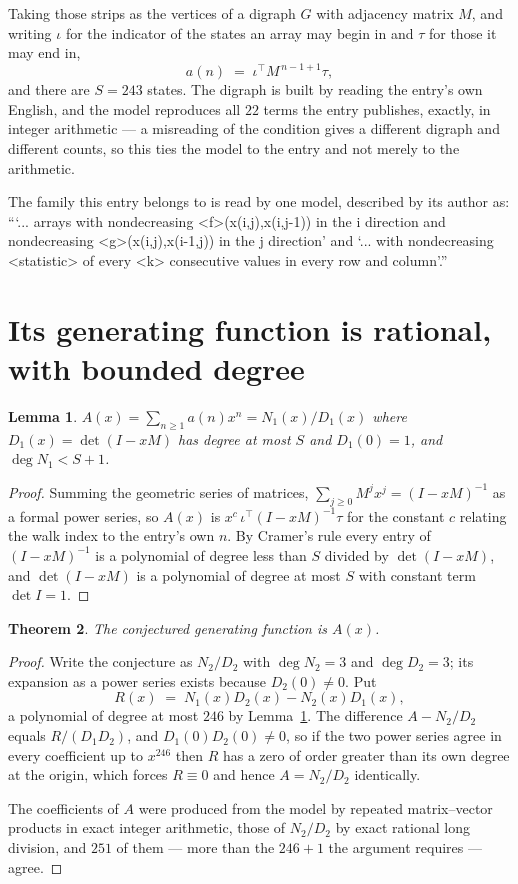 \documentclass[11pt,a4paper]{article}
\theoremstyle{plain}
\newtheorem{theorem}{Theorem}
\newtheorem{lemma}[theorem]{Lemma}
\theoremstyle{definition}
\begin{document}
Taking those strips as the vertices of a digraph $G$ with adjacency matrix $M$, and writing
$\iota$ for the indicator of the states an array may begin in and $\tau$ for those it may end
in,
\[
a(n)\;=\;\iota^{\!\top}M^{\,n-1+1}\tau ,
\]
and there are $S=243$ states. The digraph is built by reading the entry's own English, and the
model reproduces all $22$ terms the entry publishes, exactly, in integer arithmetic --- a
misreading of the condition gives a different digraph and different counts, so this ties the
model to the entry and not merely to the arithmetic.

The family this entry belongs to is read by one model, described by its author as: ```... arrays with nondecreasing <f>(x(i,j),x(i,j-1)) in the i direction and nondecreasing <g>(x(i,j),x(i-1,j)) in the j direction' and `... with nondecreasing <statistic> of every <k> consecutive values in every row and column'.''


\section{Its generating function is rational, with bounded degree}

\begin{lemma}\label{lem:rat}
$A(x)=\sum_{n\ge1}a(n)x^n=N_1(x)/D_1(x)$ where $D_1(x)=\det(I-xM)$ has degree at most
$S$ and $D_1(0)=1$, and $\deg N_1<S+1$.
\end{lemma}

\begin{proof}
Summing the geometric series of matrices, $\sum_{j\ge0}M^jx^j=(I-xM)^{-1}$ as a formal
power series, so $A(x)$ is $x^{c}\,\iota^{\!\top}(I-xM)^{-1}\tau$ for the constant $c$
relating the walk index to the entry's own $n$. By Cramer's rule every entry of
$(I-xM)^{-1}$ is a polynomial of degree less than $S$ divided by $\det(I-xM)$, and
$\det(I-xM)$ is a polynomial of degree at most $S$ with constant term $\det I=1$.
\end{proof}

\begin{theorem}
The conjectured generating function is $A(x)$.
\end{theorem}

\begin{proof}
Write the conjecture as $N_2/D_2$ with $\deg N_2=3$ and $\deg D_2=3$; its expansion as a
power series exists because $D_2(0)\neq0$. Put
\[
R(x)\;=\;N_1(x)D_2(x)-N_2(x)D_1(x),
\]
a polynomial of degree at most $246$ by Lemma~\ref{lem:rat}. The difference
$A-N_2/D_2$ equals $R/(D_1D_2)$, and $D_1(0)D_2(0)\neq0$, so if the two power series agree in
every coefficient up to $x^{246}$ then $R$ has a zero of order greater than its own
degree at the origin, which forces $R\equiv0$ and hence $A=N_2/D_2$ identically.

The coefficients of $A$ were produced from the model by repeated matrix--vector products in
exact integer arithmetic, those of $N_2/D_2$ by exact rational long division, and $251$
of them --- more than the $246+1$ the argument requires --- agree.
\end{proof}
\end{document}
